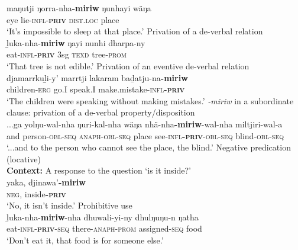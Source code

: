\documentclass[output=paper,draft,draftmode,colorlinks,citecolor=brown]{langscibook}
\begin{document}
\begin{exe}
\begin{xlist}
\gll maŋutji ŋorra-nha\textbf{-miriw} ŋunhayi wäŋa\\
eye lie\textsc{-infl}\textsc{-\textbf{priv}} \textsc{dist}.\textsc{loc} place\\
\glt `It's impossible to sleep at that place.'\citep[448]{Wilkinson1991}
%
\ex\label{ex:austr-djamb-range-edible} Privation of a de-verbal relation\\ 
\gll ḻuka-nha-\textbf{miriw} ŋayi nunhi dharpa-ny\\
eat\textsc{-infl}-\textsc{\textbf{priv}} 3sg \textsc{texd} tree-\textsc{prom}\\
\glt `That tree is not edible.'\citep[446]{Wilkinson1991}
%
\ex Privation of an eventive de-verbal relation\\
\gll djamarrkuḻi-y' marrtji lakaram baḏatju-na\textbf{-miriw}\\
children-\textsc{erg} go.I speak.I make.mistake\textsc{-infl}\textsc{\textbf{-priv}}	\\
\glt  `The children were speaking without making mistakes.'\citep[449]{Wilkinson1991}
%
\ex \emph{-miriw} in a subordinate clause: privation of a de-verbal property\slash disposition\\
\gll ...ga yolŋu-wal-nha ŋuri-kal-nha wäŋa nhä-nha\textbf{-miriw}-wal-nha miltjiri-wal-a   \\
and person\textsc{-\textsc{obl}-seq} \textsc{anaph-obl-seq} place see\textsc{-infl}\textbf{-\textsc{priv}}-\textsc{obl-seq} blind\textsc{-obl-seq}	\\
\glt `...and to the person who cannot see the place, the blind.'\citep[448]{Wilkinson1991}
%
\ex Negative predication (locative)\qquad\\ \textbf{Context:} A response to the question `is it inside?'\\
\gll yaka, djinawa'\textbf{-miriw}\\
\textsc{neg}, inside\textsc{\textbf{-priv}}\\
\glt `No, it isn't inside.'\citep[445]{Wilkinson1991}
%
\ex Prohibitive use\label{ex:austr-djamb-range-food}\\
\gll ḻuka-nha-\textbf{miriw}-nha dhuwali-yi-ny dhulŋuŋu-n ŋatha\\
eat\textsc{-infl}-\textsc{\textbf{priv}}-\textsc{seq} there-\textsc{anaph}-\textsc{prom} assigned-\textsc{seq} food\\
\glt `Don't eat it, that food is for someone else.'\citep[446]{Wilkinson1991}
    \end{xlist}\end{exe}
\end{document}
